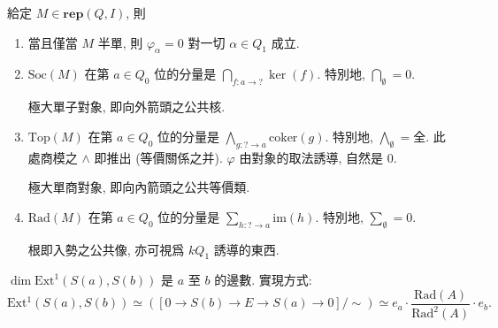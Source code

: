 \begin{theorem}
    給定 $M ∈ 𝐫𝐞𝐩(Q, I)$, 則
    \begin{enumerate}
        \item 當且僅當 $M$ 半單, 則 $φ_α=0$ 對一切 $α ∈ Q_1$ 成立. 
        \item $\mathrm{Soc}(M)$ 在第 $a ∈ Q_0$ 位的分量是 $⋂_{f : a → ?} \ker (f)$. 特別地, $⋂_∅ = 0$. 
        \begin{pinked}
            極大單子對象, 即向外箭頭之公共核.
        \end{pinked}
        \item $\mathrm{Top}(M)$ 在第 $a ∈ Q_0$ 位的分量是 $⋀_{g : ? → a} \mathrm{coker}(g)$. 特別地, $⋀_∅ = \text{全}$. 此處商模之 $∧$ 即推出 (等價關係之并). $φ$ 由對象的取法誘導, 自然是 $0$.
        \begin{pinked}
            極大單商對象, 即向內箭頭之公共等價類.
        \end{pinked}
        \item $\mathrm{Rad}(M)$ 在第 $a ∈ Q_0$ 位的分量是 $∑_{h : ? → a} \mathrm{im}(h)$. 特別地, $∑_∅ = 0$.
        \begin{pinked}
            根即入勢之公共像, 亦可視爲 $kQ_1$ 誘導的東西.
        \end{pinked}
    \end{enumerate}
\end{theorem}

\begin{proposition}[擴張]
    $\dim \mathrm{Ext}^1 (S(a), S(b))$ 是 $a$ 至 $b$ 的邊數. 實現方式: 
    \begin{equation}
        \mathrm{Ext}{^1}(S(a), S(b)) ≃ \left([0 → S(b) → E → S(a) → 0] / ∼\right) ≃ e_a ⋅ \frac{\mathrm{Rad}(A)}{\mathrm{Rad}^2(A)} ⋅ e_b.
    \end{equation}
\end{proposition}












